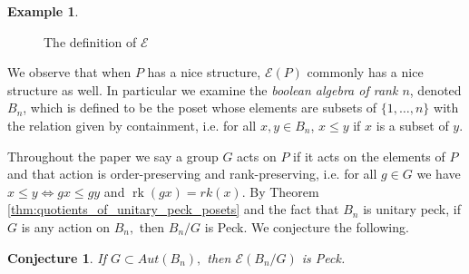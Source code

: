 \documentclass[10 pt]{amsart}
\theoremstyle{plain}
\newtheorem{conjecture}[thm]{Conjecture}
\theoremstyle{definition}
\newtheorem{eg}[thm]{Example}
\theoremstyle{remark}
\numberwithin{equation}{section}
\newcommand\rk{\operatorname{rk}}
\renewcommand{\iff}{\Leftrightarrow}
\begin{document}
\begin{eg}
\begin{figure}[h!]
\begin{center}
\iffalse
\newline
\begin{tikzpicture}[scale=.7]
  \node (one) at (90:2cm) {$6$};
  \node (b) at (150:2cm) {$4$};
  \node (a) at (210:2cm) {$2$};
  \node (zero) at (270:2cm) {$1$};
  \node (c) at (330:2cm) {$3$};
  \node (d) at (30:2cm) {$5$};
  \draw (zero) -- (a) -- (b) -- (one) -- (d) -- (c) -- (zero);
\end{tikzpicture}
\begin{tikzpicture}[scale=.7]
  \node (one) at (60:2cm) {$(5, 6)$};
  \node (b) at (120:2cm) {$(4, 6)$};
  \node (a) at (180:2cm) {$(2, 4)$};
  \node (zero) at (240:2cm) {$(1, 2)$};
  \node (c) at (300:2cm) {$(1,3)$};
  \node (d) at (0:2cm) {$(3, 5)$};
  \draw (zero) -- (a) -- (b);
  \draw (c)--(d)--(one);
\end{tikzpicture}
\begin{tikzpicture}[scale=.7]
  \node (one) at (60:2cm) {$(5, 6)$};
  \node (b) at (120:2cm) {$(4, 6)$};
  \node (a) at (180:2cm) {$(2, 4)$};
  \node (zero) at (240:2cm) {$(1, 2)$};
  \node (c) at (300:2cm) {$(1, 3)$};
  \node (d) at (0:2cm) {$(3, 5)$};
  \draw (zero) -- (a) -- (b) -- (c)--(d)--(one) -- (zero);
\end{tikzpicture}
\fi
\caption{\label{fig:EP_definition_example}The definition of $\mathcal E$}
\end{center}
\end{figure}
\end{eg}


We observe that when $P$ has a nice structure, $\mathcal E(P)$ commonly has a nice structure as well.  In particular we examine the \textit{boolean algebra of rank $n$}, denoted $B_n$, which is defined to be the poset whose elements are subsets of $\{1,\ldots,n\}$ with the relation given by containment, i.e. for all $x,y\in B_n$, $x\le y$ if $x$ is a subset of $y$.

Throughout the paper we say a group $G$ acts on $P$ if it acts on the elements of $P$ and that action is order-preserving and rank-preserving, i.e. for all $g \in G$ we have $x \leq y \iff gx \leq gy$ and $\rk(gx) = rk(x)$.  By Theorem \ref{thm:quotients_of_unitary_peck_posets} and the fact that $B_n$ is unitary peck, if $G$ is any action on $B_n,$ then $B_n/G$ is Peck.  We conjecture the following.

\begin{conjecture}\label{conj:F_of_BnG_Peck}
If $G \subset Aut(B_n),$ then $\mathcal E(B_n/G)$ is Peck.
\end{conjecture}
\end{document}
